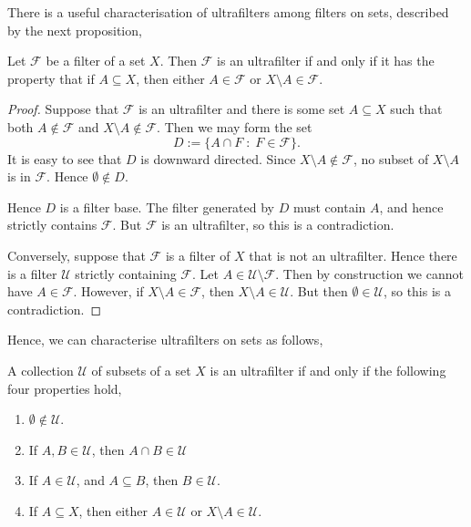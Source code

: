 \documentclass{owmaths}
\begin{document}
There is a useful characterisation of ultrafilters among filters on sets, described
by the next proposition,
\begin{proposition}
    Let $\mathcal{F}$ be a filter of a set $X$. Then $\mathcal{F}$
    is an ultrafilter if and only if it has the property that if $A \subseteq X$,
    then either $A \in \mathcal{F}$ or $X \setminus A \in \mathcal{F}$.
\end{proposition}
\begin{proof}
    Suppose that $\mathcal{F}$ is an ultrafilter and there is some set $A \subseteq X$
    such that both $A \notin \mathcal{F}$ and $X\setminus A \notin \mathcal{F}$. Then
    we may form the set
    \begin{equation*}
        D := \{A \cap F\;:\;F \in \mathcal{F}\}.
    \end{equation*}
    It is easy to see that $D$ is downward directed.
    Since $X \setminus A \notin \mathcal{F}$, no subset of $X \setminus A$ is
    in $\mathcal{F}$. Hence $\emptyset \notin D$.
    
    Hence $D$
    is a filter base. The filter
    generated by $D$ must contain $A$, and hence strictly contains $\mathcal{F}$.
    But $\mathcal{F}$ is an ultrafilter, so this is a contradiction. 
    
    Conversely, suppose that $\mathcal{F}$ is a filter of $X$ that is not
    an ultrafilter. Hence there is a filter $\mathcal{U}$
    strictly containing $\mathcal{F}$. Let $A \in \mathcal{U} \setminus \mathcal{F}$. 
    Then by construction we cannot have $A \in \mathcal{F}$. However,
    if $X \setminus A \in \mathcal{F}$, then $X \setminus A \in \mathcal{U}$.
    But then $\emptyset \in \mathcal{U}$, so this is a contradiction.
\end{proof}

Hence, we can characterise ultrafilters on sets as follows,
\begin{corollary}
    A collection $\mathcal{U}$ of subsets of a set $X$ is an ultrafilter
    if and only if the following four properties hold,
    \begin{enumerate}
        \item{} $\emptyset \notin \mathcal{U}$.
        \item{} If $A,B \in \mathcal{U}$, then $A \cap B \in \mathcal{U}$
        \item{} If $A \in \mathcal{U}$, and $A \subseteq B$, then $B \in \mathcal{U}$.
        \item{} If $A \subseteq X$, then either $A \in \mathcal{U}$
        or $X \setminus A \in \mathcal{U}$.
    \end{enumerate}
\end{corollary}
\end{document}
